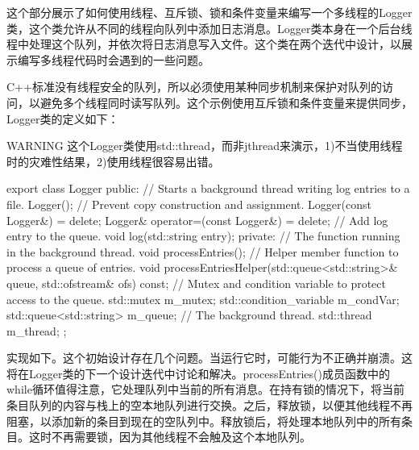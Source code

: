 这个部分展示了如何使用线程、互斥锁、锁和条件变量来编写一个多线程的Logger类，这个类允许从不同的线程向队列中添加日志消息。Logger类本身在一个后台线程中处理这个队列，并依次将日志消息写入文件。这个类在两个迭代中设计，以展示编写多线程代码时会遇到的一些问题。

C++标准没有线程安全的队列，所以必须使用某种同步机制来保护对队列的访问，以避免多个线程同时读写队列。这个示例使用互斥锁和条件变量来提供同步，Logger类的定义如下：

\begin{myWarning}{WARNING}
这个Logger类使用std::thread，而非jthread来演示，1)不当使用线程时的灾难性结果，2)使用线程很容易出错。
\end{myWarning}

\begin{cpp}
export class Logger
{
    public:
        // Starts a background thread writing log entries to a file.
        Logger();
        // Prevent copy construction and assignment.
        Logger(const Logger&) = delete;
        Logger& operator=(const Logger&) = delete;
        // Add log entry to the queue.
        void log(std::string entry);
    private:
        // The function running in the background thread.
        void processEntries();
        // Helper member function to process a queue of entries.
        void processEntriesHelper(std::queue<std::string>& queue,
            std::ofstream& ofs) const;
        // Mutex and condition variable to protect access to the queue.
        std::mutex m_mutex;
        std::condition_variable m_condVar;
        std::queue<std::string> m_queue;
        // The background thread.
        std::thread m_thread;
};
\end{cpp}

实现如下。这个初始设计存在几个问题。当运行它时，可能行为不正确并崩溃。这将在Logger类的下一个设计迭代中讨论和解决。processEntries()成员函数中的while循环值得注意，它处理队列中当前的所有消息。在持有锁的情况下，将当前条目队列的内容与栈上的空本地队列进行交换。之后，释放锁，以便其他线程不再阻塞，以添加新的条目到现在的空队列中。释放锁后，将处理本地队列中的所有条目。这时不再需要锁，因为其他线程不会触及这个本地队列。

